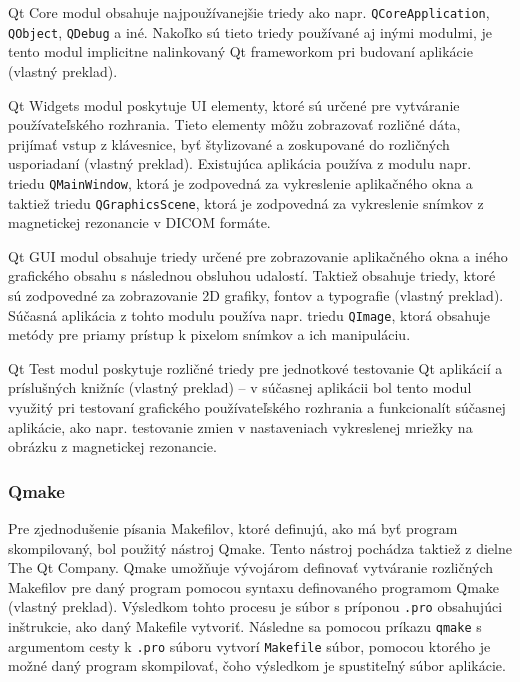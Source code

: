 Qt Core modul obsahuje najpoužívanejšie triedy ako napr. \texttt{QCoreApplication}, \texttt{QObject}, \texttt{QDebug} a iné. Nakoľko sú tieto triedy používané aj inými modulmi, je tento modul implicitne nalinkovaný Qt frameworkom pri budovaní aplikácie \cite{qtcore_description} (vlastný preklad). \newline

Qt Widgets modul poskytuje UI elementy, ktoré sú určené pre vytváranie používateľského rozhrania. Tieto elementy môžu zobrazovať rozličné dáta, prijímať vstup z klávesnice, byť štylizované a zoskupované do rozličných usporiadaní \cite{qtwidgets_description} (vlastný preklad). Existujúca aplikácia používa z modulu napr. triedu \texttt{QMainWindow}, ktorá je zodpovedná za vykreslenie aplikačného okna a taktiež triedu \texttt{QGraphicsScene}, ktorá je zodpovedná za vykreslenie snímkov z magnetickej rezonancie v DICOM formáte. \newline

Qt GUI modul obsahuje triedy určené pre zobrazovanie aplikačného okna a iného grafického obsahu s následnou obsluhou udalostí. Taktiež obsahuje triedy, ktoré sú zodpovedné za zobrazovanie 2D grafiky, fontov a typografie \cite{qtgui_description} (vlastný preklad).
Súčasná aplikácia z tohto modulu používa napr. triedu \texttt{QImage}, ktorá obsahuje metódy pre priamy prístup k pixelom snímkov a ich manipuláciu. \newline

Qt Test modul poskytuje rozličné triedy pre jednotkové testovanie Qt aplikácií a príslušných knižníc \cite{qttest_description} (vlastný preklad) -- v súčasnej aplikácii bol tento modul využitý pri testovaní grafického používateľského rozhrania a funkcionalít súčasnej aplikácie, ako napr. testovanie zmien v nastaveniach vykreslenej mriežky na obrázku z magnetickej rezonancie.

\subsubsection {Qmake}\label{qmake}

Pre zjednodušenie písania Makefilov, ktoré definujú, ako má byť program skompilovaný, bol použitý nástroj Qmake. Tento nástroj pochádza taktiež z dielne The Qt Company. Qmake umožňuje vývojárom definovať vytváranie rozličných Makefilov pre daný program pomocou syntaxu definovaného programom Qmake \cite{qmake_description} (vlastný preklad). Výsledkom tohto procesu je súbor s príponou \texttt{.pro} obsahujúci inštrukcie, ako daný Makefile vytvoriť. Následne sa pomocou príkazu \texttt{qmake} s argumentom cesty k \texttt{.pro} súboru vytvorí \texttt{Makefile} súbor, pomocou ktorého je možné daný program skompilovať, čoho výsledkom je spustiteľný súbor aplikácie.

